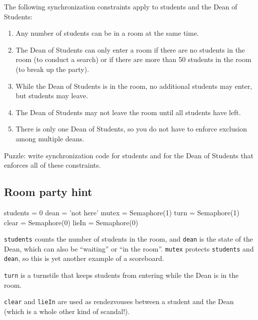 \documentclass{book}
\begin{document}
The following synchronization constraints apply to students
and the Dean of Students:

\begin{enumerate}

    \item Any number of students can be in a room at the same
          time.

    \item The Dean of Students can only enter a room if there
          are no students in the room (to conduct a search) or if
          there are more than 50 students in the room (to break up
          the party).

    \item While the Dean of Students is in the room, no additional
          students may enter, but students may leave.

    \item The Dean of Students may not leave the room until all
          students have left.

    \item There is only one Dean of Students, so you do not have
          to enforce exclusion among multiple deans.

\end{enumerate}

Puzzle: write synchronization code for students and for the
Dean of Students that enforces all of these constraints.



\subsection {Room party hint}

\begin{unbreakable}[title={Room party hint}]{}
students = 0                
dean = 'not here'           
mutex = Semaphore(1)
turn = Semaphore(1)
clear = Semaphore(0)
lieIn = Semaphore(0)
\end{unbreakable}

{\tt students} counts the number of students in the room,
and {\tt dean} is the state of the Dean, which can also be
``waiting'' or ``in the room''.
{\tt mutex} protects {\tt students} and {\tt dean}, so this
is yet another example of a scoreboard.

    {\tt turn} is a turnstile that keeps students from entering
while the Dean is in the room.

    {\tt clear} and {\tt lieIn} are used as rendezvouses between
a student and the Dean (which is a whole other kind of scandal!).
\end{document}
